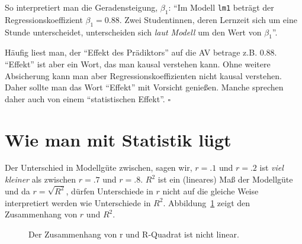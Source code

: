 \documentclass[
  letterpaper,
  twoside,
  open=any]{scrbook}
\theoremstyle{definition}
\theoremstyle{definition}
\theoremstyle{definition}
\theoremstyle{remark}
\begin{document}
So interpretiert man die Geradensteigung, \(\beta_1\): \enquote{Im
Modell \texttt{lm1} beträgt der Regressionskoeffizient
\(\beta_1 = 0.88\). Zwei Studentinnen, deren Lernzeit sich um eine
Stunde unterscheidet, unterscheiden sich \emph{laut Modell} um den Wert
von \(\beta_1\)}.

\begin{tcolorbox}[enhanced jigsaw, colbacktitle=quarto-callout-caution-color!10!white, colframe=quarto-callout-caution-color-frame, coltitle=black, arc=.35mm, breakable, opacitybacktitle=0.6, toprule=.15mm, colback=white, rightrule=.15mm, opacityback=0, toptitle=1mm, title=\textcolor{quarto-callout-caution-color}{\faFire}\hspace{0.5em}{Vorsicht}, titlerule=0mm, bottomtitle=1mm, bottomrule=.15mm, leftrule=.75mm, left=2mm]

Häufig liest man, der \enquote{Effekt des Prädiktors} auf die AV betrage
z.B. \(0.88\). \enquote{Effekt} ist aber ein Wort, das man kausal
verstehen kann. Ohne weitere Absicherung kann man aber
Regressionskoeffizienten nicht kausal verstehen. Daher sollte man das
Wort \enquote{Effekt} mit Vorsicht genießen. Manche sprechen daher auch
von einem \enquote{statistischen Effekt}. \(\square\)

\end{tcolorbox}

\section{Wie man mit Statistik
lügt}\label{wie-man-mit-statistik-luxfcgt-4}

Der Unterschied in Modellgüte zwischen, sagen wir, \(r=.1\) und \(r=.2\)
ist \emph{viel kleiner} als zwischen \(r=.7\) und \(r=.8\). \(R^2\) ist
ein (lineares) Maß der Modellgüte und da \(r = \sqrt{R^2}\), dürfen
Unterschiede in \(r\) nicht auf die gleiche Weise interpretiert werden
wie Unterschiede in \(R^2\). Abbildung~\ref{fig-r-r2} zeigt den
Zusammenhang von \(r\) und \(R^2\).

\begin{figure}


\caption{\label{fig-r-r2}Der Zusammenhang von r und R-Quadrat ist nicht
linear.}

\end{figure}%
\end{document}
